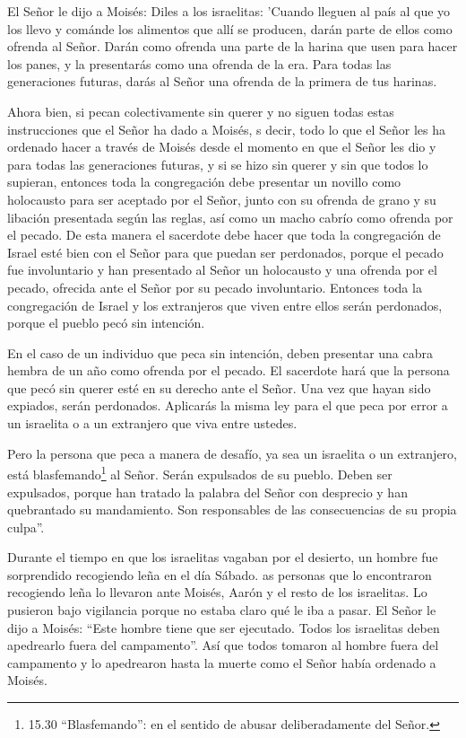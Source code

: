  El Señor le dijo a Moisés:  Diles a los
israelitas: 'Cuando lleguen al país al que yo los llevo  y
cománde los alimentos que allí se producen, darán parte de ellos como
ofrenda al Señor.  Darán como ofrenda una parte de la
harina que usen para hacer los panes, y la presentarás como una ofrenda
de la era.  Para todas las generaciones futuras, darás al
Señor una ofrenda de la primera de tus harinas.

 Ahora bien, si pecan colectivamente sin querer y no siguen
todas estas instrucciones que el Señor ha dado a Moisés,  s
decir, todo lo que el Señor les ha ordenado hacer a través de Moisés
desde el momento en que el Señor les dio y para todas las generaciones
futuras,  y si se hizo sin querer y sin que todos lo
supieran, entonces toda la congregación debe presentar un novillo como
holocausto para ser aceptado por el Señor, junto con su ofrenda de grano
y su libación presentada según las reglas, así como un macho cabrío como
ofrenda por el pecado.  De esta manera el sacerdote debe
hacer que toda la congregación de Israel esté bien con el Señor para que
puedan ser perdonados, porque el pecado fue involuntario y han
presentado al Señor un holocausto y una ofrenda por el pecado, ofrecida
ante el Señor por su pecado involuntario.  Entonces toda la
congregación de Israel y los extranjeros que viven entre ellos serán
perdonados, porque el pueblo pecó sin intención.

 En el caso de un individuo que peca sin intención, deben
presentar una cabra hembra de un año como ofrenda por el pecado.
 El sacerdote hará que la persona que pecó sin querer esté
en su derecho ante el Señor. Una vez que hayan sido expiados, serán
perdonados.  Aplicarás la misma ley para el que peca por
error a un israelita o a un extranjero que viva entre ustedes.

 Pero la persona que peca a manera de desafío, ya sea un
israelita o un extranjero, está blasfemando\footnote{15.30
  ``Blasfemando'': en el sentido de abusar deliberadamente del Señor.}
al Señor. Serán expulsados de su pueblo.  Deben ser
expulsados, porque han tratado la palabra del Señor con desprecio y han
quebrantado su mandamiento. Son responsables de las consecuencias de su
propia culpa''.

 Durante el tiempo en que los israelitas vagaban por el
desierto, un hombre fue sorprendido recogiendo leña en el día Sábado.
 as personas que lo encontraron recogiendo leña lo llevaron
ante Moisés, Aarón y el resto de los israelitas.  Lo
pusieron bajo vigilancia porque no estaba claro qué le iba a pasar.
 El Señor le dijo a Moisés: ``Este hombre tiene que ser
ejecutado. Todos los israelitas deben apedrearlo fuera del campamento''.
 Así que todos tomaron al hombre fuera del campamento y lo
apedrearon hasta la muerte como el Señor había ordenado a Moisés.

